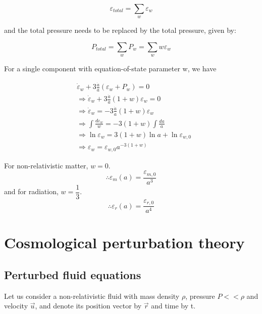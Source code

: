 \documentclass[a4,12pt,oneside]{report}
\begin{document}
   \begin{equation}
	   \varepsilon_{total} = \sum_{w} \varepsilon_w
   \end{equation}
   
   and the total pressure needs to be replaced by the total pressure, given by:
   
   \begin{equation}
	   P_{total}=\sum_{w} P_w = \sum_{w} w\varepsilon_w
   \end{equation}
   
   For a single component with equation-of-state parameter w, we have
   
   \begin{align}
	   &\dot{\varepsilon}_w + 3\frac{\dot{a}}{a}(\varepsilon_w + P_w) = 0 \\
	   &\Rightarrow \dot{\varepsilon}_w + 3\frac{\dot{a}}{a}(1+w)\varepsilon_w = 0 \\
	   &\Rightarrow \dot{\varepsilon}_w = -3\frac{\dot{a}}{a}(1+w)\varepsilon_w \\
	   &\Rightarrow \int \frac{d\varepsilon_w}{w} = -3(1+w)\int \frac{da}{a} \\
	   &\Rightarrow \ln \varepsilon_w = 3(1+w) \ln a + \ln \varepsilon_{w,0} \\
	   &\Rightarrow \varepsilon_w = \varepsilon_{w,0} a^{-3(1+w)} 
   \end{align}
   
   For non-relativistic matter, $ w=0 $.
   \begin{equation}\label{key}
	   \therefore \boxed{\varepsilon_m(a) = \frac{\varepsilon_{m,0}}{a^3}}
   \end{equation}
   and for radiation, $ w=\dfrac{1}{3} $.
   \begin{equation}\label{key}
	   \therefore \boxed{\varepsilon_r(a) = \frac{\varepsilon_{r,0}}{a^4}}
   \end{equation}
   
   \chapter{Cosmological perturbation theory}
 
   \section{Perturbed fluid equations}
   Let us consider a non-relativistic fluid with mass density $ \rho $, pressure $ P <<\rho $ and velocity $ \vec{u} $, and denote its position vector by $ \vec{r} $ and time by t.
   \\
   
\end{document}
